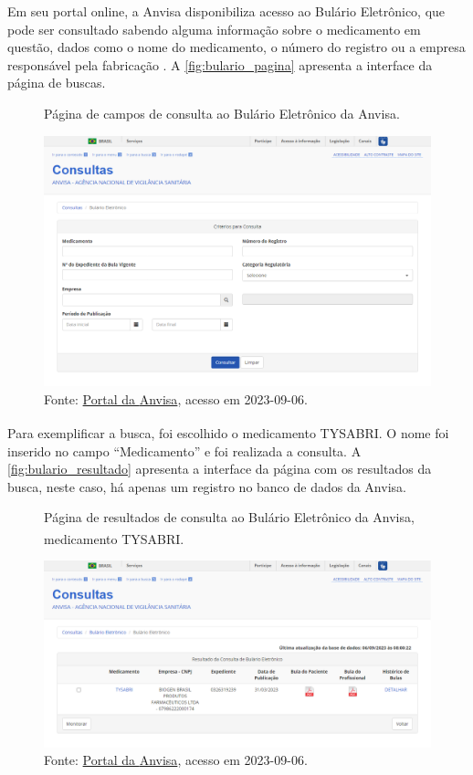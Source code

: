 Em seu portal online, a \ac{Anvisa} disponibiliza acesso ao Bulário Eletrônico, que pode ser consultado sabendo alguma informação sobre o medicamento em questão, dados como o nome do medicamento, o número do registro ou a empresa responsável pela fabricação \cite{anvisa2020bulario}.
A \autoref{fig:bulario_pagina} apresenta a interface da página de buscas.

\begin{figure}[!htbp]
    \centering
    \caption{Página de campos de consulta ao Bulário Eletrônico da \acs{Anvisa}.}
    \label{fig:bulario_pagina}
    \includegraphics[width=\textwidth]{../pictures/bulario_pagina.png}
    \caption*{Fonte: \href{https://consultas.Anvisa.gov.br/\#/bulario/}{Portal da \ac{Anvisa}}, acesso em 2023-09-06.}
\end{figure}

Para exemplificar a busca, foi escolhido o medicamento TYSABRI\textsuperscript{\tiny\textregistered}.
O nome foi inserido no campo ``Medicamento'' e foi realizada a consulta.
A \autoref{fig:bulario_resultado} apresenta a interface da página com os resultados da busca, neste caso, há apenas um registro no banco de dados da \ac{Anvisa}.

\begin{figure}[!htbp]
    \centering
    \caption[Página de resultados de consulta ao Bulário Eletrônico da \acs{Anvisa}]{Página de resultados de consulta ao Bulário Eletrônico da \acs{Anvisa}, medicamento TYSABRI\textsuperscript{\tiny\textregistered}.}
    \label{fig:bulario_resultado}
    \includegraphics[width=\textwidth]{../pictures/bulario_resultado.png}
    \caption*{Fonte: \href{https://consultas.Anvisa.gov.br/\#/bulario/q/?nomeProduto=TYSABRI}{Portal da \ac{Anvisa}}, acesso em 2023-09-06.}
\end{figure}

